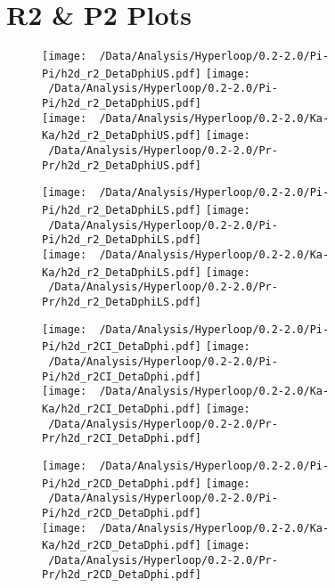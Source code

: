\documentclass[ALICE,manyauthors]{ALICE_analysis_notes}
\begin{document}
\section{R2 \& P2 Plots}
\begin{figure}[h!]
	\texttt{[image: ~/Data/Analysis/Hyperloop/0.2-2.0/Pi-Pi/h2d\_r2\_DetaDphiUS.pdf]}
	\texttt{[image: ~/Data/Analysis/Hyperloop/0.2-2.0/Pi-Pi/h2d\_r2\_DetaDphiUS.pdf]}
	\\
	\texttt{[image: ~/Data/Analysis/Hyperloop/0.2-2.0/Ka-Ka/h2d\_r2\_DetaDphiUS.pdf]}
	\texttt{[image: ~/Data/Analysis/Hyperloop/0.2-2.0/Pr-Pr/h2d\_r2\_DetaDphiUS.pdf]}
	\\
\end{figure}
\begin{figure}[h!]
	\texttt{[image: ~/Data/Analysis/Hyperloop/0.2-2.0/Pi-Pi/h2d\_r2\_DetaDphiLS.pdf]}
	\texttt{[image: ~/Data/Analysis/Hyperloop/0.2-2.0/Pi-Pi/h2d\_r2\_DetaDphiLS.pdf]}
	\\
	\texttt{[image: ~/Data/Analysis/Hyperloop/0.2-2.0/Ka-Ka/h2d\_r2\_DetaDphiLS.pdf]}
	\texttt{[image: ~/Data/Analysis/Hyperloop/0.2-2.0/Pr-Pr/h2d\_r2\_DetaDphiLS.pdf]}
	\\
\end{figure}
\begin{figure}[h!]
	\texttt{[image: ~/Data/Analysis/Hyperloop/0.2-2.0/Pi-Pi/h2d\_r2CI\_DetaDphi.pdf]}
	\texttt{[image: ~/Data/Analysis/Hyperloop/0.2-2.0/Pi-Pi/h2d\_r2CI\_DetaDphi.pdf]}
	\\
	\texttt{[image: ~/Data/Analysis/Hyperloop/0.2-2.0/Ka-Ka/h2d\_r2CI\_DetaDphi.pdf]}
	\texttt{[image: ~/Data/Analysis/Hyperloop/0.2-2.0/Pr-Pr/h2d\_r2CI\_DetaDphi.pdf]}
	\\
\end{figure}
\begin{figure}[h!]
	\texttt{[image: ~/Data/Analysis/Hyperloop/0.2-2.0/Pi-Pi/h2d\_r2CD\_DetaDphi.pdf]}
	\texttt{[image: ~/Data/Analysis/Hyperloop/0.2-2.0/Pi-Pi/h2d\_r2CD\_DetaDphi.pdf]}
	\\
	\texttt{[image: ~/Data/Analysis/Hyperloop/0.2-2.0/Ka-Ka/h2d\_r2CD\_DetaDphi.pdf]}
	\texttt{[image: ~/Data/Analysis/Hyperloop/0.2-2.0/Pr-Pr/h2d\_r2CD\_DetaDphi.pdf]}
	\\
\end{figure}
\end{document}
